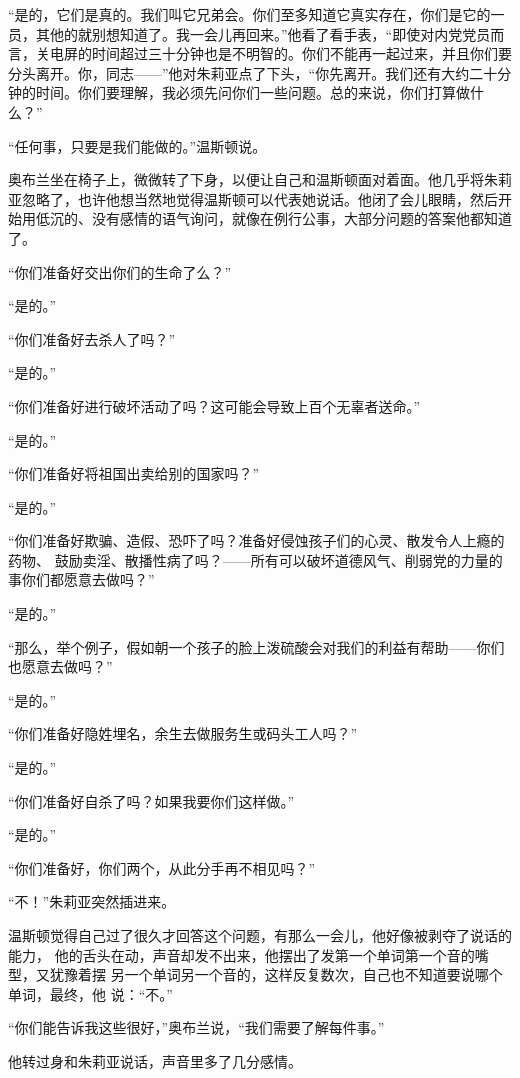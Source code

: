 ``是的，它们是真的。我们叫它兄弟会。你们至多知道它真实存在，你们是它的一员，其他的就别想知道了。我一会儿再回来。''他看了看手表，``即使对内党党员而言，关电屏的时间超过三十分钟也是不明智的。你们不能再一起过来，并且你们要分头离开。你，同志——''他对朱莉亚点了下头，``你先离开。我们还有大约二十分钟的时间。你们要理解，我必须先问你们一些问题。总的来说，你们打算做什么？''

``任何事，只要是我们能做的。''温斯顿说。

奥布兰坐在椅子上，微微转了下身，以便让自己和温斯顿面对着面。他几乎将朱莉亚忽略了，也许他想当然地觉得温斯顿可以代表她说话。他闭了会儿眼睛，然后开始用低沉的、没有感情的语气询问，就像在例行公事，大部分问题的答案他都知道了。

``你们准备好交出你们的生命了么？''

``是的。''

``你们准备好去杀人了吗？''

``是的。''

``你们准备好进行破坏活动了吗？这可能会导致上百个无辜者送命。''

``是的。''

``你们准备好将祖国出卖给别的国家吗？''

``是的。''

``你们准备好欺骗、造假、恐吓了吗？准备好侵蚀孩子们的心灵、散发令人上瘾的药物、
鼓励卖淫、散播性病了吗？——所有可以破坏道德风气、削弱党的力量的事你们都愿意去做吗？''

``是的。''

``那么，举个例子，假如朝一个孩子的脸上泼硫酸会对我们的利益有帮助——你们也愿意去做吗？''

``是的。''

``你们准备好隐姓埋名，余生去做服务生或码头工人吗？''

``是的。''

``你们准备好自杀了吗？如果我要你们这样做。''

``是的。''

``你们准备好，你们两个，从此分手再不相见吗？''

``不！''朱莉亚突然插进来。

温斯顿觉得自己过了很久才回答这个问题，有那么一会儿，他好像被剥夺了说话的能力，
他的舌头在动，声音却发不出来，他摆出了发第一个单词第一个音的嘴型，又犹豫着摆
另一个单词另一个音的，这样反复数次，自己也不知道要说哪个单词，最终，他
说：``不。''

``你们能告诉我这些很好，''奥布兰说，``我们需要了解每件事。''

他转过身和朱莉亚说话，声音里多了几分感情。

